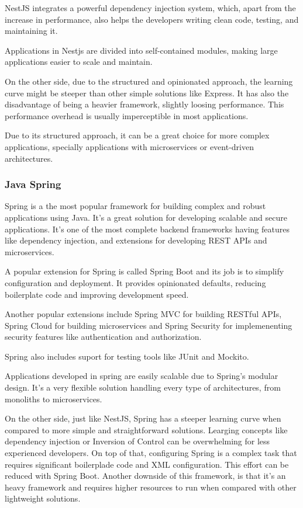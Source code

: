 NestJS integrates a powerful dependency injection system, which, apart from the
increase in performance, also helps the developers writing clean code, testing,
and maintaining it\cite{nestJS}.

Applications in Nestjs are divided into
self-contained modules, making large applications easier to scale and maintain.

On the other side, due to the structured and opinionated approach, the learning
curve might be steeper than other simple solutions like Express.
It has also the disadvantage of being a heavier framework, slightly loosing
performance. This performance overhead is usually imperceptible in most
applications.

Due to its structured approach, it can be a great choice for more complex
applications, specially applications with microservices or event-driven
architectures.
\subsubsection{Java Spring}
Spring is a the most popular framework for building complex and robust
applications using Java. It's a great solution for developing scalable and secure
applications. It's one of the most complete backend frameworks having features
like dependency injection, and extensions for developing \gls{REST} \gls{API}s and
microservices\cite{GFGJava}.

A popular extension for Spring is called Spring Boot and its job is to
simplify configuration and deployment. It provides opinionated defaults,
reducing boilerplate code and improving development speed\cite{GFGJava}.

Another popular extensions include Spring \gls{MVC} for building \gls{REST}ful \gls{API}s, Spring
Cloud for building microservices and Spring Security for implemenenting
security features like authentication and authorization\cite{GFGJava}.

Spring also includes suport for testing tools like JUnit and Mockito.

Applications developed in spring are easily scalable due to Spring's modular
design.
It's a very flexible solution handling every type of architectures, from
monoliths to microservices.

On the other side, just like NestJS, Spring has a steeper learning curve when
compared to more simple and straightforward solutions. Learging concepts like
dependency injection or Inversion of Control can be overwhelming for less
experienced developers.
On top of that, configuring Spring is a complex task that requires significant
boilerplade code and \gls{XML} configuration. This effort can be reduced with Spring
Boot.
Another downside of this framework, is that it's an heavy framework and
requires higher resources to run when compared with other lightweight solutions.

